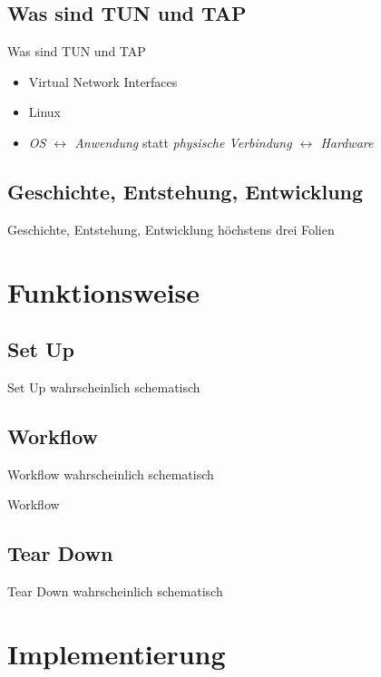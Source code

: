\documentclass[ngerman,aspectratio=169]{beamer}
\begin{document}
	\subsection{Was sind TUN und TAP}
	\begin{frame}{Was sind TUN und TAP}
		\begin{itemize}
			\item Virtual Network Interfaces
			\item Linux
			\item \textit{OS $ \leftrightarrow $ Anwendung} statt \textit{physische Verbindung $ \leftrightarrow $ Hardware}
		\end{itemize}
	\end{frame}

	\subsection{Geschichte, Entstehung, Entwicklung}
	\begin{frame}{Geschichte, Entstehung, Entwicklung}
		höchstens drei Folien
	\end{frame}

	\section{Funktionsweise}
	\subsection{Set Up}
	\begin{frame}{Set Up}
		wahrscheinlich schematisch
	\end{frame}

	\subsection{Workflow}
	\begin{frame}{Workflow}
		wahrscheinlich schematisch		
	\end{frame}{Workflow}

	\subsection{Tear Down}
	\begin{frame}{Tear Down}
		wahrscheinlich schematisch
	\end{frame}

	\section{Implementierung}
\end{document}
